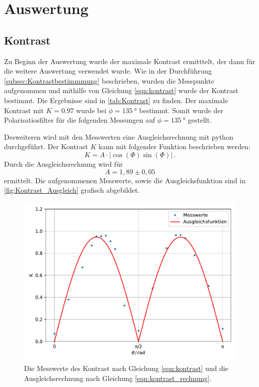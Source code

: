 \section{Auswertung}
\label{sec:Auswertung}

\subsection{Kontrast}
\label{subsec:Kontrast}
Zu Beginn der Auswertung wurde der maximale Kontrast ermitttelt, der dann für die weitere Auswertung verwendet wurde.
Wie in der Durchführung \ref{subsec:Kontrastbestimmmung} beschrieben, wurden die Messpunkte aufgenommen und mithilfe von Gleichung \eqref{eqn:kontrast} wurde der Kontrast bestimmt.
Die Ergebnisse sind in \autoref{tab:Kontrast} zu finden.
Der maximale Kontrast mit $K = \num{0.97}$ wurde bei $\phi = \SI{135}{\degree}$ bestimmt.
Somit wurde der Polarisatiosfilter für die folgenden Messungen auf $\phi = \SI{135}{\degree}$ gestellt.

\noindent
Desweiteren wird mit den Messwerten eine Ausgleichsrechnung mit python durchgeführt.
Der Kontrast $K$ kann mit folgender Funktion beschrieben werden:
\begin{equation}
  K = A \cdot | \cos(\Phi)\sin(\Phi) | \, . \label{eqn:kontrast_rechnung}
\end{equation}
Durch die Ausgleichsrechnung wird für 
\begin{equation*}
  A = 1,89 \pm 0,05
\end{equation*} 
ermittelt.
Die aufgenommenen Messwerte, sowie die Ausgleichsfunktion sind in \autoref{fig:Kontrast_Ausgleich} grafisch abgebildet.

\begin{figure}[H]
  \centering
  \includegraphics[width=\textwidth]{build/kontrast_ausgleich.pdf}
  \caption{Die Messwerte des Kontrast nach Gleichung \eqref{eqn:kontrast} und die Ausgleichsrechnung nach Gleichung \eqref{eqn:kontrast_rechnung}.}
  \label{fig:Kontrast_Ausgleich}
\end{figure}

